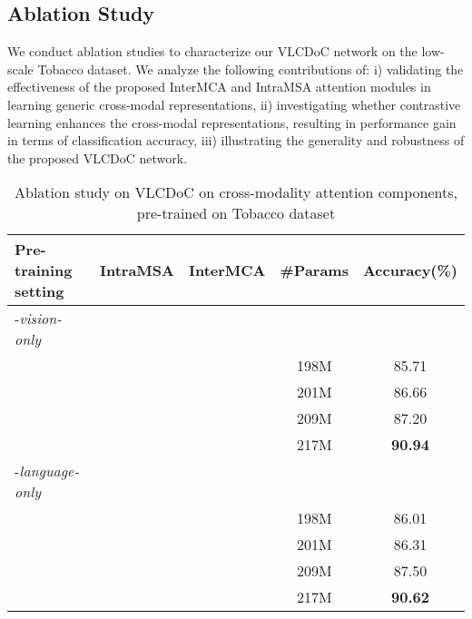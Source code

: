 \documentclass[preprint,review,12pt]{elsarticle}
\begin{document}
\subsection{Ablation Study}
We conduct ablation studies to characterize our VLCDoC network on the low-scale Tobacco dataset. We analyze the following contributions of: i) validating the effectiveness of the proposed InterMCA and IntraMSA attention modules in learning generic cross-modal representations, ii) investigating whether contrastive learning enhances the cross-modal representations, resulting in performance gain in terms of classification accuracy, iii) illustrating the generality and robustness of the proposed VLCDoC network.
\begin{table}[t]
\footnotesize
\centering
\caption{Ablation study on VLCDoC on cross-modality attention components, pre-trained on Tobacco dataset}
{\begin{tabular}{@{}lcccc@{}} 
    \toprule
    Pre-training setting & IntraMSA  &   InterMCA  & \#Params &   Accuracy(\%)\\
    \midrule
     -\textit{vision-only}  &  &  &  & \\
    \midrule
    &        &           &   198M    &   85.71 \\
    & &           &   201M    &   86.66 \\
    &        &    &   209M    &   87.20   \\
    & &    &    217M   &   \textbf{90.94}\\
    \midrule
     -\textit{language-only}  &  &  &  & \\
    \midrule
    &        &           &   198M    &   86.01 \\
    & &           &   201M    &   86.31 \\
    &        &    &   209M    &   87.50   \\
    & &    &   217M    &   \textbf{90.62}\\
    \bottomrule
\end{tabular}}
\label{tab:Ablation_Study_Tobacco}
\end{table}
\end{document}
